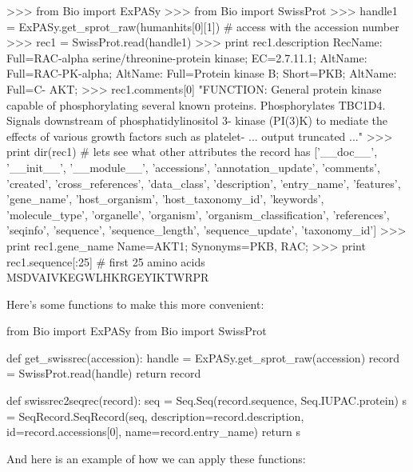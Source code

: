 \documentclass[10pt,letterpaper]{scrartcl}
\begin{document}
\begin{python}
>>> from Bio import ExPASy
>>> from Bio import SwissProt
>>> handle1 = ExPASy.get_sprot_raw(humanhits[0][1]) # access with the accession number
>>> rec1 = SwissProt.read(handle1)
>>> print rec1.description
RecName: Full=RAC-alpha serine/threonine-protein kinase; EC=2.7.11.1; AltName: 
Full=RAC-PK-alpha; AltName: Full=Protein kinase B; Short=PKB; AltName: Full=C-
AKT;
>>> rec1.comments[0]
"FUNCTION: General protein kinase capable of phosphorylating several known 
proteins. Phosphorylates TBC1D4. Signals downstream of phosphatidylinositol 3-
kinase (PI(3)K) to mediate the effects of various growth factors such as platelet-
... output truncated ..."
>>> print dir(rec1) # lets see what other attributes the record has
['__doc__', '__init__', '__module__', 'accessions', 'annotation_update', 'comments', 'created', 'cross_references', 'data_class', 'description', 'entry_name', 'features', 'gene_name', 'host_organism', 'host_taxonomy_id', 'keywords', 'molecule_type', 'organelle', 'organism', 'organism_classification', 'references', 'seqinfo', 'sequence', 'sequence_length', 'sequence_update', 'taxonomy_id']
>>> print rec1.gene_name
Name=AKT1; Synonyms=PKB, RAC;
>>> print rec1.sequence[:25] # first 25 amino acids
MSDVAIVKEGWLHKRGEYIKTWRPR
\end{python}

Here's some functions to make this more convenient:

\begin{python}
from Bio import ExPASy
from Bio import SwissProt

def get_swissrec(accession):
    handle = ExPASy.get_sprot_raw(accession)
    record = SwissProt.read(handle)
    return record
    
def swissrec2seqrec(record):
    seq = Seq.Seq(record.sequence, Seq.IUPAC.protein)
    s = SeqRecord.SeqRecord(seq, description=record.description, 
                id=record.accessions[0], name=record.entry_name)
    return s        
\end{python}
%
And here is an example of how we can apply these functions:
\end{document}
